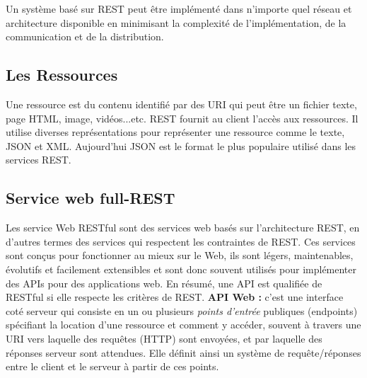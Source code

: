 Un système basé sur REST peut être implémenté dans n'importe quel réseau et architecture disponible en minimisant la complexité de l'implémentation, de la communication et de la distribution.\cite{richardson2008restful}

\subsection{Les Ressources}
Une ressource est du contenu identifié par des URI  qui peut être un fichier texte, page HTML, image, vidéos...etc.
REST fournit au client l'accès aux ressources. Il utilise diverses représentations pour représenter une ressource comme le texte, JSON et XML. Aujourd'hui JSON est le format le plus populaire utilisé dans les services REST.

\subsection{Service web full-REST}
Les service Web RESTful sont des services web basés sur l'architecture REST, en d'autres termes des services qui respectent les contraintes de REST.
Ces services sont conçus pour fonctionner au mieux sur le Web, ils sont légers, maintenables, évolutifs et facilement extensibles et sont donc souvent utilisés pour implémenter des APIs pour des applications web.\cite{refTutorialPointsREST}
\newline 
En résumé, une API est qualifiée de RESTful si elle respecte les critères de REST.
\newline
\newline
\textbf{API Web :} c'est une interface coté serveur qui consiste en un ou plusieurs \emph{points d'entrée} publiques (endpoints) spécifiant la location d'une ressource et comment y accéder, souvent à travers une URI vers laquelle des requêtes (HTTP) sont envoyées, et par laquelle des réponses serveur sont attendues.
Elle définit ainsi un système de requête/réponses entre le client et le serveur à partir de ces points.

\newpage
